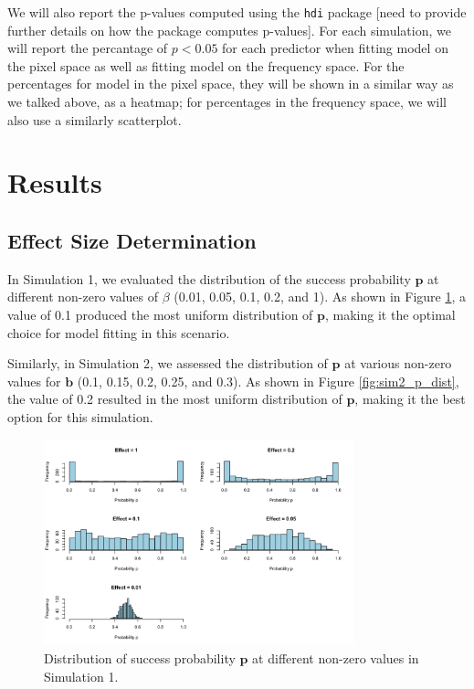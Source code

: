 \documentclass[12pt]{article}
\begin{document}
We will also report the p-values computed using the \texttt{hdi} package [need to provide further details on how the package computes p-values]. For each simulation, we will report the percantage of \( p<0.05 \) for each predictor when fitting model on the pixel space as well as fitting model on the frequency space. For the percentages for model in the pixel space, they will be shown in a similar way as we talked above, as a heatmap; for percentages in the frequency space, we will also use a similarly scatterplot.





\section{Results}

\subsection{Effect Size Determination}

In Simulation 1, we evaluated the distribution of the success probability \( \mathbf{p} \) at different non-zero values of \( \beta \) (0.01, 0.05, 0.1, 0.2, and 1). As shown in Figure \ref{fig:sim1_p_dist}, a value of 0.1 produced the most uniform distribution of \( \mathbf{p} \), making it the optimal choice for model fitting in this scenario.

Similarly, in Simulation 2, we assessed the distribution of \( \mathbf{p} \) at various non-zero values for \( \mathbf{b} \) (0.1, 0.15, 0.2, 0.25, and 0.3). As shown in Figure \ref{fig:sim2_p_dist}, the value of 0.2 resulted in the most uniform distribution of \( \mathbf{p} \), making it the best option for this simulation.

\begin{figure}[H]
	\centering
	\includegraphics[width=0.8\textwidth]{sim1_p_dist.png}
  \caption{Distribution of success probability \( \mathbf{p} \) at different non-zero values in Simulation 1.}
	\label{fig:sim1_p_dist}
\end{figure}
\end{document}
